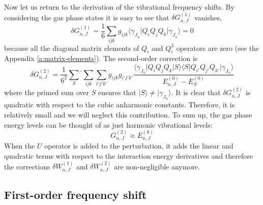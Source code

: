 \documentclass[a4paper,titlepage,twoside,fleqn,12pt]{book}
\begin{document}
\begin{refsection}
Now let us return to the derivation of the vibrational frequency shifts. 
By considering the gas phase states it is easy to see that 
$\delta G_{n,J}^{(1)}$ vanishes,
%
\begin{equation}
\delta G_{n,J}^{(1)} = \frac{1}{6}\sum_{ijk} g_{ijk} 
\langle \gamma_{J_n} \vert Q_iQ_jQ_k \vert \gamma_{J_n} \rangle = 0
\end{equation}
%
because all the diagonal matrix elements of $Q_i$ and $Q_i^3$ operators
are zero (see the Appendix \ref{a:matrix-elements}).  %
The second\hyp{}order correction is 
%
\begin{equation}
\delta G_{n,J}^{(2)} = \frac{1}{6^2} \sum_{S}{^{'}} \sum_{ijk}\sum_{i'j'k'} g_{ijk} g_{i'j'k'}
\frac{\langle \gamma_{J_n} \vert Q_iQ_jQ_k \vert S \rangle \langle S \vert Q_{i'}Q_{j'}Q_{k'} \vert \gamma_{J_n} \rangle }
{ E_{n,J}^{(0)} - E_{S}^{(0)} }
\end{equation}
%
where the primed sum over $S$ ensures that $\vert S \rangle \ne \vert \gamma_{J_n} \rangle$. 
It is clear that $\delta G_{n,J}^{(2)}$ is quadratic with respect to the cubic anharmonic constants.
Therefore, it is relatively small and we will neglect this contribution.
To sum up, the gas phase energy levels can be thought of as just 
harmonic vibrational levels:
%
\begin{equation}\label{e:ge}
G_{n,J}^{(2)} \approx E_{n,J}^{(0)}
\end{equation}
%
When the $U$ operator is added to the perturbation, it adds the linear
and quadratic terms with respect to the interaction energy derivatives and therefore
the corrections $\delta W_{n,J}^{(1)}$ and $\delta W_{n,J}^{(2)}$ 
are non\hyp{}negligible anymore.

\subsection{First-order frequency shift}


\end{refsection}
\end{document}
